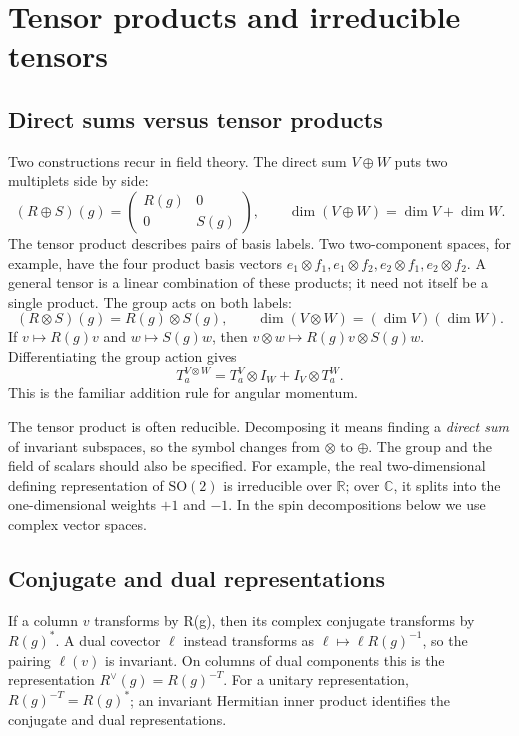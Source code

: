 \documentclass[11pt]{article}
\newcommand{\R}{\mathbb{R}}
\newcommand{\SO}{\mathrm{SO}}
\newcommand{\C}{\mathbb C}
\begin{document}
\section{Tensor products and irreducible tensors}
\label{sec:tensors}
\subsection{Direct sums versus tensor products}
Two constructions recur in field theory. The direct sum \(V\oplus W\)
puts two multiplets side by side:
\[
 (R\oplus S)(g)=
 \begin{pmatrix}R(g)&0\\0&S(g)\end{pmatrix},\qquad
 \dim(V\oplus W)=\dim V+\dim W.
\]
The tensor product describes pairs of basis labels. Two two-component
spaces, for example, have the four product basis vectors
\(e_1\otimes f_1,e_1\otimes f_2,e_2\otimes f_1,e_2\otimes f_2\).
A general tensor is a linear combination of these products; it need not
itself be a single product. The group acts on both labels:
\begin{equation}
 (R\otimes S)(g)=R(g)\otimes S(g),\qquad
 \dim(V\otimes W)=(\dim V)(\dim W).
 \label{eq:tensor-product}
\end{equation}
If \(v\mapsto R(g)v\) and \(w\mapsto S(g)w\), then
\(v\otimes w\mapsto R(g)v\otimes S(g)w\).
Differentiating the group action gives
\begin{equation}
 T_a^{V\otimes W}=T_a^V\otimes I_W+I_V\otimes T_a^W.
 \label{eq:tensor-generators}
\end{equation}
This is the familiar addition rule for angular momentum.

The tensor product is often reducible. Decomposing it means finding a
\emph{direct sum} of invariant subspaces, so the symbol changes from
\(\otimes\) to \(\oplus\). The group and the field of scalars should also
be specified. For example, the real two-dimensional defining
representation of \(\SO(2)\) is irreducible over \(\R\); over \(\C\),
it splits into the one-dimensional weights \(+1\) and \(-1\).
In the spin decompositions below we use complex vector spaces.

\subsection{Conjugate and dual representations}
If a column \(v\) transforms by R(g), then its complex conjugate
transforms by \(R(g)^*\). A dual covector \(\ell\) instead transforms as
\(\ell\mapsto\ell R(g)^{-1}\), so the pairing \(\ell(v)\) is invariant.
On columns of dual components this is the representation
\(R^\vee(g)=R(g)^{-T}\). For a unitary representation,
\(R(g)^{-T}=R(g)^*\); an invariant Hermitian inner product identifies
the conjugate and dual representations.
\end{document}
